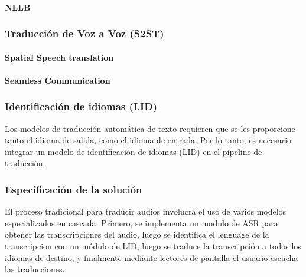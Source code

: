 \paragraph{NLLB}
\paragraph{}
\subsubsection{Traducción de Voz a Voz (S2ST)}
\paragraph{Spatial Speech translation}
\paragraph{Seamless Communication}
\paragraph{}

\subsubsection{Identificación de idiomas (LID)}
Los modelos de traducción automática de texto requieren que se les proporcione tanto el idioma de salida, como el idioma de entrada. Por lo tanto, es necesario integrar un modelo de identificación de idiomas (LID) en el pipeline de traducción.


\subsubsection{Especificación de la solución}

El proceso tradicional para traducir audios involucra el uso de varios modelos especializados en cascada. Primero, se implementa un modulo de ASR para obtener las transcripciones del audio, luego se identifica el lenguage de la transcripcion con un módulo de LID, luego se traduce la transcripción a todos los idiomas de destino, y finalmente mediante lectores de pantalla el usuario escucha las traducciones.

